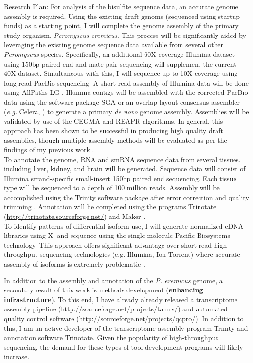\documentclass[11pt]{article}
\begin{document}
Research Plan: For analysis of the bisulfite sequence data, an accurate genome assembly is required. Using the existing draft genome (sequenced using startup funds) as a starting point, I will complete the genome assembly of the primary study organism, \textit{Peromyscus eremicus}. This process will be significantly aided by leveraging the existing genome sequence data available from several other \textit{Peromyscus} species. Specifically, an additional 60X coverage Illumina dataset using 150bp paired end and mate-pair sequencing will supplement the current 40X dataset. Simultaneous with this, I will sequence up to 10X coverage using long-read PacBio sequencing. A short-read assembly of Illumina data will be done using AllPaths-LG \citep{Maccallum:2009du}.  Illumina contigs will be assembled with the corrected PacBio data using the software package SGA \citep{Simpson:2012ef} or an overlap-layout-consensus assembler (\textit{e.g.} Celera, \cite{Miller:2008jx}) to generate a primary \textit{de novo} genome assembly. Assemblies will be validated by use of the CEGMA \citep{Parra:2007df} and REAPR \citep{Hunt:2013hj} algorithms. In general, this approach has been shown to be successful in producing high quality draft assemblies, though multiple assembly methods will be evaluated as per the findings of my previous work \citep{Bradnam:2013gx}.\\

To annotate the genome, RNA and smRNA sequence data from several tissues, including liver, kidney, and brain will be generated. Sequence data will consist of Illumina strand-specific small-insert 150bp paired end sequencing. Each tissue type will be sequenced to a depth of 100 million reads.  Assembly will be accomplished using the Trinity software package \citep{Haas:2013jq,Grabherr:2011jb} after error correction \citep{MacManes:2013ec} and quality trimming \citep{MacManes:2013ex}. Annotation will be completed using the programs Trinotate (\url{http://trinotate.sourceforge.net/}) and Maker \citep{Cantarel:2008jo}. \\

To identify patterns of differential isoform use, I will generate normalized cDNA libraries using X, and sequence using the single molecule Pacific Biosystems technology. This approach offers significant advantage over short read high-throughput sequencing technologies (e.g. Illumina, Ion Torrent) where accurate assembly of isoforms is extremely problematic \citep{Pyrkosz:2013tm}.


In addition to the assembly and annotation of the \textit{P. eremicus} genome, a secondary result of this work is methods development (\textbf{enhancing infrastructure}). To this end, I have already already released a transcriptome assembly pipeline (\url{http://sourceforge.net/projects/tamrs/}) and automated quality control software (\url{http://sourceforge.net/projects/qcpro/}). In addition to this, I am an active developer of the transcriptome assembly program Trinity and annotation software Trinotate. Given the popularity of high-throughput sequencing, the demand for these types of tool development programs will likely increase. \\
\end{document}
